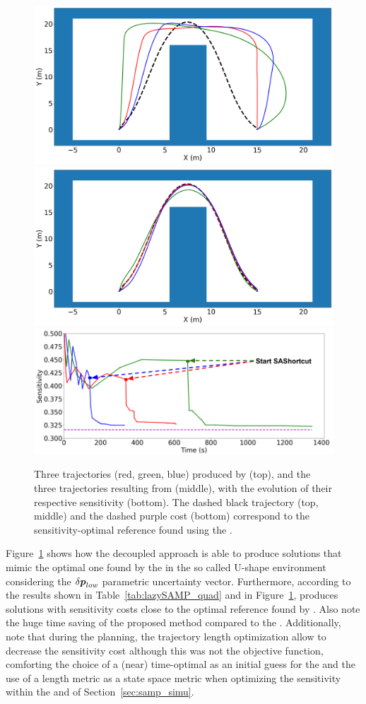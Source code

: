 \begin{figure}[t]
    \centering
    \includegraphics[width=0.7\linewidth]{figures/samp/U_shape_3in1_before.png}
    \includegraphics[width=0.7\linewidth]{figures/samp/U_shape_3in1_after.png}
    \includegraphics[width=0.7\linewidth]{figures/samp/U_shape_3in1_sensi.png}
    \caption{Three trajectories (red, green, blue) produced by  (top), and the three trajectories resulting from  (middle), with the evolution of their respective sensitivity (bottom). 
    The dashed black trajectory (top, middle) and the dashed purple cost (bottom) correspond to the sensitivity-optimal reference found using the .}
    \label{fig:U_shape}
\end{figure}

Figure~\ref{fig:U_shape} shows how the decoupled approach is able to produce solutions that mimic the optimal one found by the  in the so called U-shape environment considering the $\delta\boldsymbol{p}_{low}$ parametric uncertainty vector.
Furthermore, according to the results shown in Table~\ref{tab:lazySAMP_quad} and in Figure~\ref{fig:U_shape},  produces solutions with sensitivity costs close to the optimal reference found by . 
Also note the huge time saving of the proposed method compared to the .
Additionally, note that during the  planning, the trajectory length optimization allow to decrease the sensitivity cost although this was not the objective function, comforting the choice of a (near) time-optimal as an initial guess for the  and the use of a length metric as a state space metric when optimizing the sensitivity within the  and  of Section~\ref{sec:samp_simu}.

